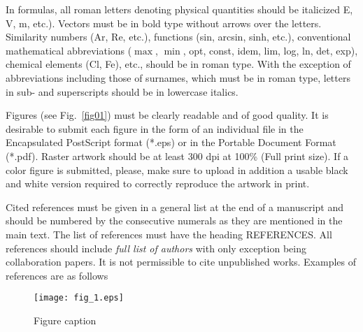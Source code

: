 \documentclass[a4paper]{panl}
\begin{document}
In formulas, all roman letters denoting physical quantities should be italicized E, V, m, etc.). Vectors must be in bold type without arrows over the letters. Similarity numbers (Ar, Re, etc.), functions (sin, arcsin, sinh, etc.), conventional mathematical abbreviations ($\max$, $\min$, opt, const, idem, lim, log, ln, det, exp), chemical elements (Cl, Fe), etc., should be in roman type. With the exception of abbreviations including those of surnames, which must be in roman type, letters in sub- and superscripts should be in lowercase italics.

Figures (see Fig.~\ref{fig01}) must be clearly readable and of good quality. It is desirable to submit each figure in the form of an individual file in the Encapsulated PostScript format (*.eps) or in the Portable Document Format (*.pdf). Raster artwork should be at least 300 dpi at 100\% (Full print size).
If a color figure is submitted, please, make sure to upload in addition a usable black and white version required to correctly reproduce the artwork in print.

Cited references must be given in a general list at the end of a manuscript and should be numbered by the consecutive numerals as they are mentioned in the main text.
The list of references must have the heading REFERENCES. All references should include \emph{full list of authors} with only exception being collaboration papers.
It is not permissible to cite unpublished works. Examples of references \cite{Silenko:2014yxa,Bogolyubov:1983gp,hanson-67,wright-63,Anselmino:2008jk,Aad:2012tfa,Beda:2009kx,Franceschini:2015kwy} are as follows


\begin{figure}[t]
\begin{center}
\texttt{[image: fig\_1.eps]}
\vspace{-3mm}
\caption{Figure caption}
\end{center}
\vspace{-5mm}
\end{figure}




\end{document}
